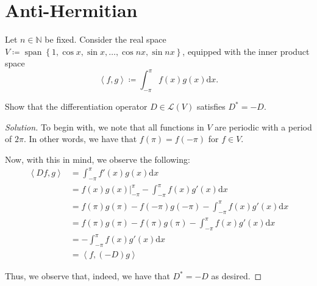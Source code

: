 \documentclass{article}
\newenvironment{solution}{\begin{proof}[Solution]}{\end{proof}}
\newcommand{\NN}{\mathbb{N}}
\DeclareMathOperator*{\vspan}{\mathrm{span}}
\newcommand{\innerproduct}[2]{\left\langle{#1}, {#2}\right\rangle}
\begin{document}
\newpage

\section{Anti-Hermitian}
\begin{hw}
	Let $n \in \NN$ be fixed. Consider the real space $V \coloneq \vspan\left\{  1, \cos x, \sin x,\ldots, \cos nx, \sin nx \right\}$, equipped with the inner product space
	\begin{equation*}
		\innerproduct{f}{g} \coloneq \int_{-\pi}^{\pi} f(x) g(x) \mathrm dx.
	\end{equation*}

	Show that the differentiation operator $D \in \mathcal L(V)$ satisfies $D^{*} = -D$. 
\end{hw}
\begin{solution}
	To begin with, we note that all functions in $V$ are periodic with a period of $2\pi$. In other words, we have that $f(\pi) = f(-\pi)$ for $f \in V$.
	
	Now, with this in mind, we observe the following:
	\begin{align*}
		\innerproduct{Df}{g} &= \int_{-\pi}^{\pi} f'(x)g(x) \mathrm dx \\
		&= f(x)g(x)\big|_{-\pi}^{\pi} - \int_{-\pi}^{\pi} f(x)g'(x) \mathrm dx \\
		&= f(\pi)g(\pi) - f(-\pi)g(-\pi) - \int_{-\pi}^{\pi} f(x)g'(x)\mathrm dx \\
		&= f(\pi)g(\pi) - f(\pi)g(\pi) - \int_{-\pi}^{\pi} f(x)g'(x)\mathrm dx \\
		&= -\int_{-\pi}^{\pi} f(x)g'(x)\mathrm dx \\
		&= \innerproduct{f}{(-D)g}
	\end{align*}

	Thus, we observe that, indeed, we have that $D^{*} = -D$ as desired.
\end{solution}

\newpage
\end{document}
